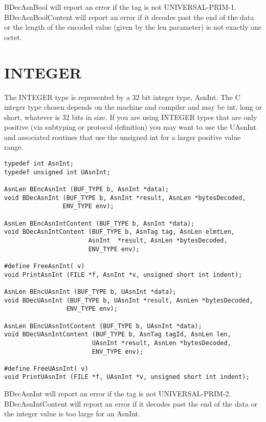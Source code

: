 {\C BDecAsnBool} will report an error if the tag is not
UNIVERSAL-PRIM-1.  {\C BDecAsnBoolContent} will report an error if it
decodes past the end of the data or the length of the encoded value
(given by the {\C len} parameter) is not exactly one octet.

\section{\label{int-C-section}INTEGER}

The INTEGER type is represented by a 32 bit integer type, {\C AsnInt}.
The C integer type chosen depends on the machine and compiler and may be {\C int}, {\C long} or {\C short}, whatever is 32 bits in size.
If you are using INTEGER types that are only positive (via subtyping or
protocol definition) you may want to use the {\C UAsnInt} and
associated routines that use the unsigned int for a larger positive value range.
\begin{small}
\begin{verbatim}
typedef int AsnInt;
typedef unsigned int UAsnInt;

AsnLen BEncAsnInt (BUF_TYPE b, AsnInt *data);
void BDecAsnInt (BUF_TYPE b, AsnInt *result, AsnLen *bytesDecoded,
                ENV_TYPE env);

AsnLen BEncAsnIntContent (BUF_TYPE b, AsnInt *data);
void BDecAsnIntContent (BUF_TYPE b, AsnTag tag, AsnLen elmtLen,
                       AsnInt  *result, AsnLen *bytesDecoded,
                       ENV_TYPE env);

#define FreeAsnInt( v)
void PrintAsnInt (FILE *f, AsnInt *v, unsigned short int indent);

AsnLen BEncUAsnInt (BUF_TYPE b, UAsnInt *data);
void BDecUAsnInt (BUF_TYPE b, UAsnInt *result, AsnLen *bytesDecoded,
                 ENV_TYPE env);

AsnLen BEncUAsnIntContent (BUF_TYPE b, UAsnInt *data);
void BDecUAsnIntContent (BUF_TYPE b, AsnTag tagId, AsnLen len,
                        UAsnInt *result, AsnLen *bytesDecoded,
                        ENV_TYPE env);

#define FreeUAsnInt( v)
void PrintUAsnInt (FILE *f, UAsnInt *v, unsigned short int indent);
\end{verbatim}
\end{small}

{\C BDecAsnInt} will report an error if the tag is not
UNIVERSAL-PRIM-2.  {\C BDecAsnIntContent} will report an error if it
decodes past the end of the data or the integer value is too large for
an {\C AsnInt}.

